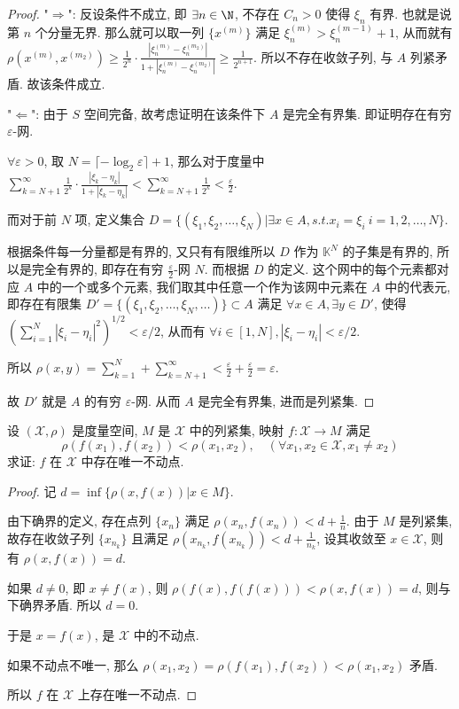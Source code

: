 \begin{proof}
	"$\Rightarrow$": 反设条件不成立, 即 $\exists n\in\N$, 不存在 $C_n>0$ 使得 $\xi_n$ 有界. 也就是说第 $n$ 个分量无界. 那么就可以取一列 $\{x^{(m)}\}$ 满足 $\xi_n^{(m)}>\xi_n^{(m-1)}+1$, 从而就有 $\rho(x^{(m)},x^{(m_2)})\geqslant \frac 1 {2^n}\cdot\frac{|\xi_n^{(m)}-\xi_n^{(m_2)}|}{1+|\xi_n^{(m)}-\xi_n^{(m_2)}|}\geqslant\frac{1}{2^{n+1}}$. 所以不存在收敛子列, 与 $A$ 列紧矛盾. 故该条件成立.

	"$\Leftarrow$": 由于 $S$ 空间完备, 故考虑证明在该条件下 $A$ 是完全有界集. 即证明存在有穷 $\varepsilon$-网.

	$\forall \varepsilon>0$, 取 $N=\lceil -\log_2 \varepsilon \rceil + 1$, 那么对于度量中 $\sum\limits_{k=N+1}^\infty \frac{1}{2^k}\cdot\frac{|\xi_k-\eta_k|}{1+|\xi_k-\eta_k|}<\sum\limits_{k=N+1}^\infty\frac{1}{2^k}<\frac{\varepsilon}{2}$.

	而对于前 $N$ 项, 定义集合 $D=\{(\xi_1,\xi_2,\ldots,\xi_N)|\exists x\in A, s.t. x_i=\xi_i\ i=1,2,\ldots,N\}$.

	根据条件每一分量都是有界的, 又只有有限维所以 $D$ 作为 $\mathbb K^N$ 的子集是有界的, 所以是完全有界的, 即存在有穷 $\frac{\varepsilon}{2}$-网 $N$. 而根据 $D$ 的定义. 这个网中的每个元素都对应 $A$ 中的一个或多个元素, 我们取其中任意一个作为该网中元素在 $A$ 中的代表元, 即存在有限集 $D'=\{(\xi_1,\xi_2,\ldots,\xi_N,\ldots)\}\subset A$ 满足 $\forall x\in A, \exists y\in D'$, 使得 $(\sum\limits_{i=1}^N |\xi_i-\eta_i|^2)^{1/2}<\varepsilon/2$, 从而有 $\forall i\in[1,N], |\xi_i-\eta_i|<\varepsilon/2$.

	所以 $\rho(x,y)=\sum\limits_{k=1}^N+\sum\limits_{k=N+1}^\infty<\frac\varepsilon 2+\frac\varepsilon 2=\varepsilon$.

	故 $D'$ 就是 $A$ 的有穷 $\varepsilon$-网. 从而 $A$ 是完全有界集, 进而是列紧集.
\end{proof}

\problem[1.3.8] 设 $(\mathscr X,\rho)$ 是度量空间, $M$ 是 $\mathscr X$ 中的列紧集, 映射 $f:\mathscr X\to M$ 满足 $$\rho(f(x_1),f(x_2))<\rho(x_1,x_2),\quad (\forall x_1,x_2\in \mathscr X,x_1\neq x_2)$$ 求证: $f$ 在 $\mathscr X$ 中存在唯一不动点.

\begin{proof}
	记 $d=\inf\{\rho(x,f(x))|x\in M\}$.
	
	由下确界的定义, 存在点列 $\{x_n\}$ 满足 $\rho(x_n,f(x_n))<d+\frac 1 n$. 由于 $M$ 是列紧集, 故存在收敛子列 $\{x_{n_k}\}$ 且满足 $\rho(x_{n_k},f(x_{n_k}))<d+\frac 1{n_k}$, 设其收敛至 $x\in\mathscr X$, 则有 $\rho(x,f(x))=d$. 
	
	如果 $d\neq 0$, 即 $x\neq f(x)$, 则 $\rho(f(x),f(f(x)))<\rho(x,f(x))=d$, 则与下确界矛盾. 所以 $d=0$.
	
	于是 $x=f(x)$, 是 $\mathscr X$ 中的不动点.
	
	如果不动点不唯一, 那么 $\rho(x_1,x_2)=\rho(f(x_1),f(x_2))<\rho(x_1,x_2)$ 矛盾.
	
	所以 $f$ 在 $\mathscr X$ 上存在唯一不动点.
	
\end{proof}


